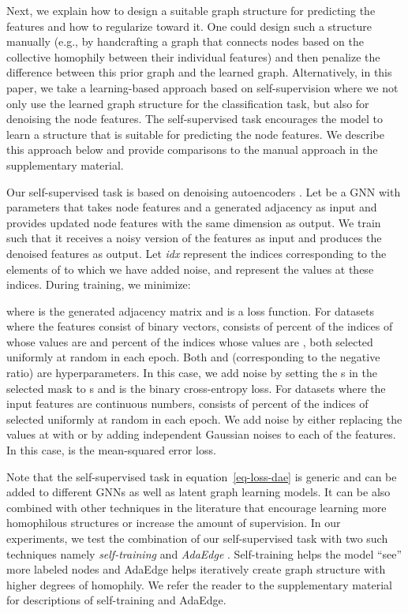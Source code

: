 \documentclass{article}
\def\eqref#1{equation~\ref{#1}}
\begin{document}
Next, we explain how to design a suitable graph structure for predicting the features and how to regularize toward it. One could design such a structure manually (e.g., by handcrafting a graph that connects nodes based on the collective homophily between their individual features) and then penalize the difference between this prior graph and the learned graph. Alternatively, in this paper, we take a learning-based approach based on self-supervision where we not only use the learned graph structure for the classification task, but also for denoising the node features. The self-supervised task encourages the model to learn a structure that is suitable for predicting the node features. We describe this approach below and provide comparisons to the manual approach in the supplementary material.

Our self-supervised task is based on denoising autoencoders \citep{vincent2008extracting}. Let  be a GNN with parameters  that takes node features and a generated adjacency as input and provides updated node features with the same dimension as output. We train  such that it receives a noisy version  of the features  as input and produces the denoised features  as output. Let \emph{idx} represent the indices corresponding to the elements of  to which we have added noise, and  represent the values at these indices. During training, we minimize:

where  is the generated adjacency matrix and  is a loss function.
For datasets where the features consist of binary vectors,  consists of  percent of the indices of  whose values are  and  percent of the indices whose values are , both selected uniformly at random in each epoch. Both  and  (corresponding to the negative ratio) are hyperparameters. In this case, we add noise by setting the s in the selected mask to s and  is the binary cross-entropy loss. For datasets where the input features are continuous numbers,  consists of  percent of the indices of  selected uniformly at random in each epoch. We add noise by either replacing the values at  with  or by adding independent Gaussian noises to each of the features. In this case,  is the mean-squared error loss.

Note that the self-supervised task in \eqref{eq-loss-dae} is generic and can be added to different GNNs as well as latent graph learning models. It can be also combined with other techniques in the literature that encourage learning more homophilous structures or increase the amount of supervision. In our experiments, we test the combination of our self-supervised task with two such techniques namely \emph{self-training} \cite{li2018deeper} and \emph{AdaEdge} \cite{chen2020measuring}. Self-training helps the model ``see'' more labeled nodes and AdaEdge helps iteratively create graph structure with higher degrees of homophily. We refer the reader to the supplementary material for descriptions of self-training and AdaEdge.
\end{document}

